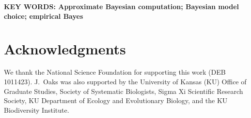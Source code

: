 \documentclass[letterpaper,12pt]{article}
\begin{document}
\begin{linenumbers}
{    \vspace{12pt}
    \noindent\textbf{KEY WORDS: Approximate Bayesian computation; Bayesian
        model choice; empirical Bayes} 

}

\newpage



\section*{Acknowledgments}
We thank the National Science Foundation for supporting this work (DEB
1011423).
J.\ Oaks was also supported by the University of Kansas (KU) Office of Graduate
Studies, Society of Systematic Biologists, Sigma Xi Scientific Research
Society, KU Department of Ecology and Evolutionary Biology, and the KU
Biodiversity Institute.


% 

\newpage
\singlespacing

\renewcommand\listfigurename{Figure Captions}
\renewcommand\cftdotsep{\cftnodots}
\setlength\cftbeforefigskip{10pt}
\listoffigures


\end{linenumbers}

\newpage
\singlespacing



\clearpage

\newpage



\setcounter{figure}{0}
\setcounter{table}{0}
\setcounter{page}{1}

\singlespacing

\renewcommand{\refname}{\noindent\MakeUppercase{\LARGE\sffamily\upshape supporting information}}





\end{document}
